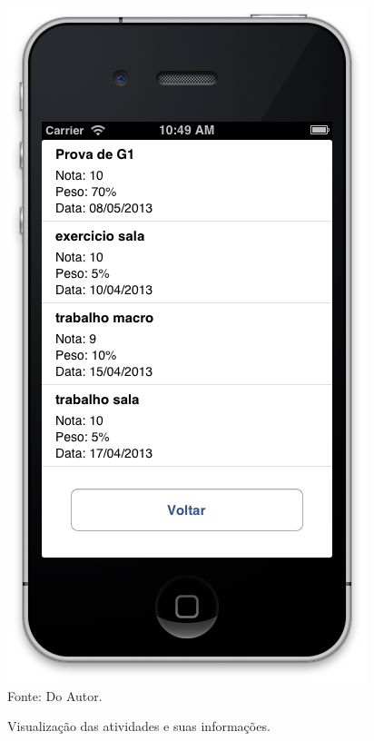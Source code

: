 \begin{figure}[!htb]
     \centering
     \caption[Formulário Notas da Graduação - Visualização de Atividades]{Visualização das atividades e suas informações.}
     \includegraphics[scale=0.34]{imagens/formatividades.png}
     \\  Fonte: Do Autor.
\end{figure}
